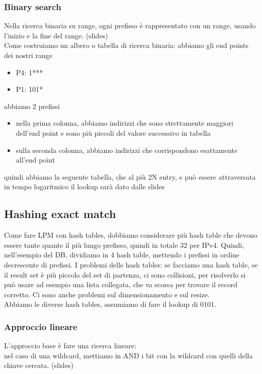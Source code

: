 \documentclass[12pt, oneside]{extbook} %
\begin{document}
\subsubsection{Binary search}
Nella ricerca binaria su range, ogni prefisso è rappresentato con un range, usando l'inizio e la fine del range. (slides)\\ Come costruiamo un albero o tabella di ricerca binaria: abbiamo gli end points dei nostri range
\begin{itemize}
\item P4: 1***
\item P1: 101*
\end{itemize}
abbiamo 2 prefissi
\begin{itemize}
\item nella prima colonna, abbiamo indirizzi che sono strettamente maggiori dell'end point e sono più piccoli del valore successivo in tabella
\item sulla seconda colonna, abbiamo indirizzi che corrispondono esattamente all'end point
\end{itemize}
quindi abbiamo la seguente tabella, che al più 2N entry, e può essere attraversata in tempo logaritmico
il lookup sarà dato dalle slides
\subsection{Hashing exact match}
Come fare LPM con hash tables, dobbiamo considerare più hash table che devono essere tante quante il più lungo prefisso, quindi in totale 32 per IPv4. Quindi, nell'esempio del DB, dividiamo in 4 hash table, mettendo i prefissi in ordine decrescente di prefissi. I problemi delle hash tables: se facciamo una hash table, se il result set è più piccolo del set di partenza, ci sono collisioni, per risolverlo si può usare ad esempio una lista collegata, che va scorsa per trovare il record corretto. Ci sono anche problemi sul dimensionamento e sul resize.\\ Abbiamo le diverse hash tables, assumiamo di fare il lookup di 0101. 
\subsubsection{Approccio lineare}
L'approccio base è fare una ricerca lineare:\\
nel caso di una wildcard, mettiamo in AND i bit con la wildcard con quelli della chiave cercata.
(slides)
\end{document}
